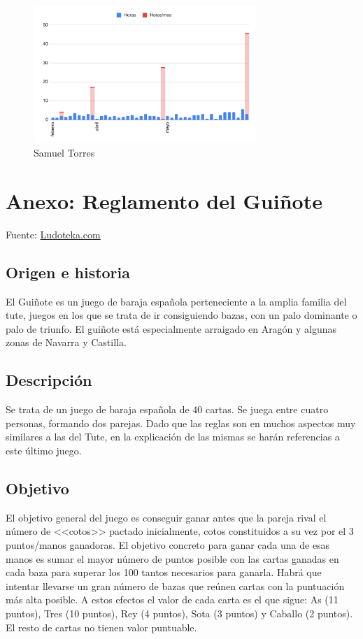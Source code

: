 \documentclass{article}
\begin{document}
\begin{figure}[h]
    \centering
    \includegraphics[width=0.75\textwidth]{../images/graficos/SAMUEL}
    \caption{Samuel Torres}
\end{figure}


\FloatBarrier

\section{Anexo: Reglamento del Guiñote}
Fuente: \href{https://www.ludoteka.com/clasika/guinote.html}{Ludoteka.com}

\subsection*{Origen e historia}
El Guiñote es un juego de baraja española perteneciente a la amplia familia del tute, juegos en los que se trata de ir consiguiendo bazas, con un palo dominante o palo de triunfo. El guiñote está especialmente arraigado en Aragón y algunas zonas de Navarra y Castilla.

\subsection*{Descripción}
Se trata de un juego de baraja española de 40 cartas. Se juega entre cuatro personas, formando dos parejas. Dado que las reglas son en muchos aspectos muy similares a las del Tute, en la explicación de las mismas se harán referencias a este último juego.

\subsection*{Objetivo}
El objetivo general del juego es conseguir ganar antes que la pareja rival el número de <<cotos>> pactado inicialmente, cotos constituidos a su vez por el 3 puntos/manos ganadoras. El objetivo concreto para ganar cada una de esas manos es sumar el mayor número de puntos posible con las cartas ganadas en cada baza para superar los 100 tantos necesarios para ganarla. Habrá que intentar llevarse un gran número de bazas que reúnen cartas con la puntuación más alta posible. A estos efectos el valor de cada carta es el que sigue: As (11 puntos), Tres (10 puntos), Rey (4 puntos), Sota (3 puntos) y Caballo (2 puntos). El resto de cartas no tienen valor puntuable.
\end{document}
